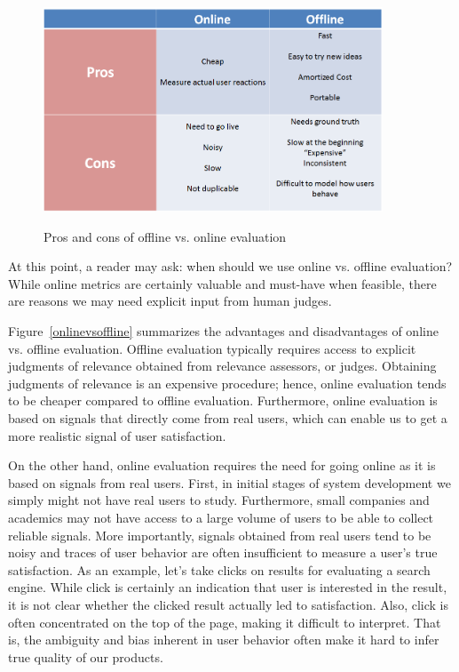 \documentclass[openany]{now} %
\begin{document}
\begin{figure}
	\centering
	{
	\includegraphics[width=0.9\textwidth]{images/online_vs_offline}
	}\vspace*{3em}
	\caption{Pros and cons of offline vs. online evaluation}
\end{figure}\label{onlinevsoffline}

At this point, a reader may ask: when should we use online vs. offline evaluation? While online metrics are certainly valuable and must-have when feasible, there are reasons we may need explicit input from human judges. 

Figure~\ref{onlinevsoffline} summarizes the advantages and disadvantages of online vs. offline evaluation. Offline evaluation typically requires access to explicit judgments of relevance obtained from relevance assessors, or judges. Obtaining judgments of relevance is an expensive procedure; hence, online evaluation tends to be cheaper compared to offline evaluation. Furthermore, online evaluation is based on signals that directly come from real users, which can enable us to get a more realistic signal of user satisfaction. 

On the other hand, online evaluation requires the need for going online as it is based on signals from real users. First, in initial stages of system development we simply might not have real users to study. Furthermore, small companies and academics may not have access to a large volume of users to be able to collect reliable signals. More importantly, signals obtained from real users tend to be noisy and traces of user behavior are often insufficient to measure a user's true satisfaction. As an example, let's take clicks on results for evaluating a search engine. While click is certainly an indication that user is interested in the result, it is not clear whether the clicked result actually led to satisfaction. Also, click is often concentrated on the top of the page, making it difficult to interpret. That is, the ambiguity and bias inherent in user behavior often make it hard to infer true quality of our products. 
\end{document}
